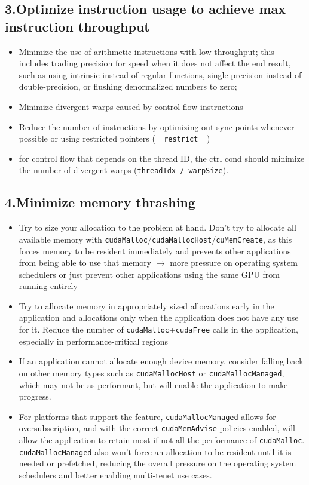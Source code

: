 \subsection*{3.Optimize instruction usage to achieve max instruction throughput}
\begin{itemize}
\item Minimize the use of arithmetic instructions with low throughput; this includes trading precision for speed when it does not affect the end result, such as using intrinsic instead of regular functions, single-precision instead of double-precision, or flushing denormalized numbers to zero;
\item Minimize divergent warps caused by control flow instructions
\item Reduce the number of instructions by optimizing out sync points whenever possible or using restricted pointers (\texttt{\_\_restrict\_\_})
\item for control flow that depends on the thread ID, the ctrl cond should minimize the number of divergent warps (\texttt{threadIdx / warpSize}).
\end{itemize}
\subsection*{4.Minimize memory thrashing}
\begin{itemize}
\item Try to size your allocation to the problem at hand. Don’t try to allocate all available memory with \texttt{cudaMalloc}/\texttt{cudaMallocHost}/\texttt{cuMemCreate}, as this forces memory to be resident immediately and prevents other applications from being able to use that memory $\to$ more pressure on operating system schedulers or just prevent other applications using the same GPU from running entirely
\item Try to allocate memory in appropriately sized allocations early in the application and allocations only when the application does not have any use for it.  Reduce the number of \texttt{cudaMalloc}+\texttt{cudaFree} calls in the application, especially in performance-critical regions
\item If an application cannot allocate enough device memory, consider falling back on other memory types such as \texttt{cudaMallocHost} or \texttt{cudaMallocManaged}, which may not be as performant, but will enable the application to make progress.
\item For platforms that support the feature, \texttt{cudaMallocManaged} allows for oversubscription, and with the correct \texttt{cudaMemAdvise} policies enabled, will allow the application to retain most if not all the performance of \texttt{cudaMalloc}. \texttt{cudaMallocManaged} also won’t force an allocation to be resident until it is needed or prefetched, reducing the overall pressure on the operating system schedulers and better enabling multi-tenet use cases.
\end{itemize}
